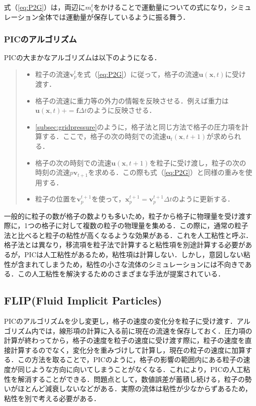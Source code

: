 \documentclass[a4j,12pt]{jreport}
\begin{document}
式（\ref{eq:P2G}）は，両辺に$m^t_i$をかけることで運動量についての式になり，シミュレーション全体では運動量が保存しているように振る舞う．

\subsubsection{PICのアルゴリズム} \label{subsec:PIC_algo}
PICの大まかなアルゴリズムは以下のようになる．
\begin{quote}
	\begin{itemize}
		\item 粒子の流速$\bm{v}^{t}_p$を式（\ref{eq:P2G}）に従って，格子の流速$\bm{u}(\bm{x},t)$に受け渡す．
		\item 格子の流速に重力等の外力の情報を反映させる．例えば重力は$\bm{u}(\bm{x},t) += \bm{f}\Delta t$のように反映させる．
		\item \ref{subsec:gridpressure}のように，格子法と同じ方法で格子の圧力項を計算する．ここで，格子の次の時刻での流速$\bm{u}_t(\bm{x},t+1)$が求められる．
		\item 格子の次の時刻での流速$\bm{u}(\bm{x},t+1)$を粒子に受け渡し，粒子の次の時刻の流速$p\bm{v}_{t+1}$を求める．この際も式（\ref{eq:P2G}）と同様の重みを使用する．
		\item 粒子の位置を$\bm{v}^{t+1}_p$を使って，$\bm{x}^{t+1}_p = \bm{v}^{t+1}_p\Delta t $のように更新する．
	\end{itemize}
\end{quote}

一般的に粒子の数が格子の数よりも多いため，粒子から格子に物理量を受け渡す際に，1つの格子に対して複数の粒子の物理量を集める．この際に，通常の粒子法と比べると粒子の粘性が高くなるような効果がある．これを人工粘性と呼ぶ．格子法とは異なり，移流項を粒子法で計算すると粘性項を別途計算する必要があるが，PICは人工粘性があるため，粘性項は計算しない．しかし，意図しない粘性が含まれてしまうため，粘性の小さな流体のシミュレーションには不向きである．この人工粘性を解決するためのさまざまな手法が提案されている．
\subsection{FLIP(Fluid Implicit Particles)} \label{subsec:FLIP}
PICのアルゴリズムを少し変更し，格子の速度の変化分を粒子に受け渡す．アルゴリズム内では，線形項の計算に入る前に現在の流速を保存しておく．圧力項の計算が終わってから，格子の速度を粒子の速度に受け渡す際に，粒子の速度を直接計算するのでなく，変化分を重みづけして計算し，現在の粒子の速度に加算する．この方法を取ることで，PICのように，格子の影響の範囲内にある粒子の速度が同じような方向に向いてしまうことがなくなる．これにより，PICの人工粘性を解消することができる．問題点として，数値誤差が蓄積し続ける，粒子の勢いがほとんど減衰しないなどがある．実際の流体は粘性が少なからずあるため，粘性を別で考える必要がある．
\end{document}
